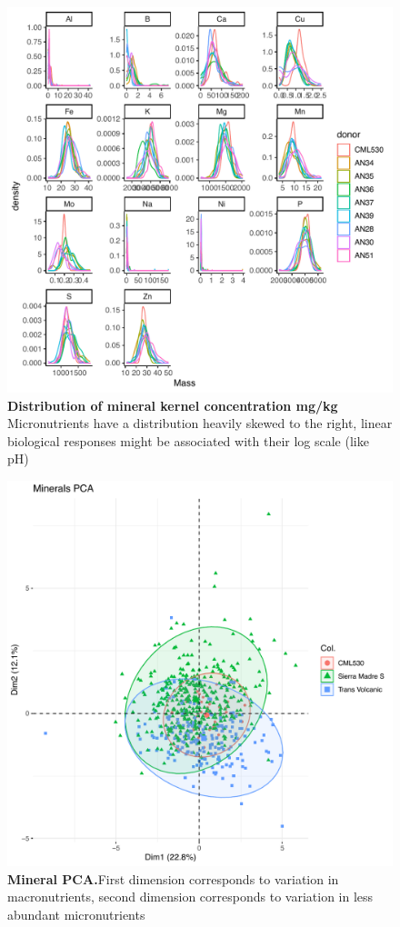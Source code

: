 \begin{figure}[!ht]
\includegraphics[width=0.8\paperwidth]{Chapter-3/figs/fig3-1.pdf}
\caption{\textbf{Distribution of mineral kernel concentration mg/kg}
Micronutrients have a distribution heavily skewed to the right, linear biological responses might be associated with their log scale (like pH)}
\label{Fig3.1}
\end{figure}
\clearpage

\begin{figure}[!ht]
\includegraphics[width=0.8\paperwidth]{Chapter-3/figs/fig3-2.pdf}
\caption{\textbf{Mineral PCA.}First dimension corresponds to variation in macronutrients, second dimension corresponds to variation in less abundant micronutrients}
\label{Fig3.2}
\end{figure}
\clearpage

